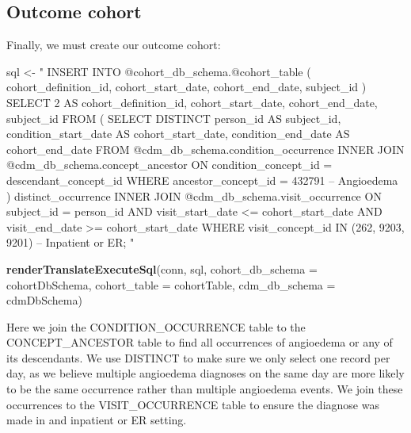 \documentclass[11pt]{book}
\newenvironment{Shaded}{\begin{snugshade}}{\end{snugshade}}
\newcommand{\DataTypeTok}[1]{\textcolor[rgb]{0.13,0.29,0.53}{#1}}
\newcommand{\KeywordTok}[1]{\textcolor[rgb]{0.13,0.29,0.53}{\textbf{#1}}}
\newcommand{\NormalTok}[1]{#1}
\newcommand{\StringTok}[1]{\textcolor[rgb]{0.31,0.60,0.02}{#1}}
\theoremstyle{definition}
\theoremstyle{definition}
\theoremstyle{definition}
\theoremstyle{remark}
\begin{document}
\hypertarget{outcome-cohort}{%
\subsection{Outcome cohort}\label{outcome-cohort}}

Finally, we must create our outcome cohort:

\begin{Shaded}
\begin{Highlighting}[]
\NormalTok{sql <-}\StringTok{ "}
\StringTok{INSERT INTO @cohort_db_schema.@cohort_table (}
\StringTok{ cohort_definition_id,}
\StringTok{ cohort_start_date,}
\StringTok{ cohort_end_date,}
\StringTok{subject_id}
\StringTok{)}
\StringTok{SELECT 2 AS cohort_definition_id,}
\StringTok{  cohort_start_date,}
\StringTok{  cohort_end_date,}
\StringTok{  subject_id}
\StringTok{FROM (}
\StringTok{  SELECT DISTINCT person_id AS subject_id,}
\StringTok{    condition_start_date AS cohort_start_date,}
\StringTok{    condition_end_date AS cohort_end_date}
\StringTok{  FROM @cdm_db_schema.condition_occurrence}
\StringTok{  INNER JOIN @cdm_db_schema.concept_ancestor}
\StringTok{    ON condition_concept_id = descendant_concept_id}
\StringTok{  WHERE ancestor_concept_id = 432791 -- Angioedema}
\StringTok{) distinct_occurrence}
\StringTok{INNER JOIN @cdm_db_schema.visit_occurrence}
\StringTok{  ON subject_id = person_id}
\StringTok{  AND visit_start_date <= cohort_start_date}
\StringTok{  AND visit_end_date >= cohort_start_date}
\StringTok{WHERE visit_concept_id IN (262, 9203,}
\StringTok{    9201) -- Inpatient or ER;}
\StringTok{"}

\KeywordTok{renderTranslateExecuteSql}\NormalTok{(conn, sql,}
                          \DataTypeTok{cohort_db_schema =}\NormalTok{ cohortDbSchema,}
                          \DataTypeTok{cohort_table =}\NormalTok{ cohortTable,}
                          \DataTypeTok{cdm_db_schema =}\NormalTok{ cdmDbSchema)}
\end{Highlighting}
\end{Shaded}

Here we join the CONDITION\_OCCURRENCE table to the CONCEPT\_ANCESTOR table to find all occurrences of angioedema or any of its descendants. We use DISTINCT to make sure we only select one record per day, as we believe multiple angioedema diagnoses on the same day are more likely to be the same occurrence rather than multiple angioedema events. We join these occurrences to the VISIT\_OCCURRENCE table to ensure the diagnose was made in and inpatient or ER setting.
\end{document}
